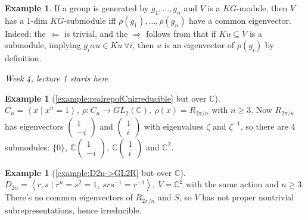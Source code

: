 \documentclass[a4paper]{article}
\newcommand{\la}{\left\langle}
\newcommand{\ra}{\right\rangle}
\newcommand{\C}{\mathbb{C}}
\theoremstyle{definition}
\newtheorem{example}[defn]{Example}
\begin{document}
\begin{example}
If a group is generated by $g_1,\ldots,g_n$ and $V$ is a $KG$-module, then $V$ has a 1-dim $KG$-submodule iff $\rho(g_1),\ldots,\rho(g_n)$ have a common eigenvector. Indeed; the $\Leftarrow$ is trivial, and the $\Rightarrow$ follows from that if $Ku\subseteq V$ is a submodule, implying $g_i\alpha u\in Ku \ \forall i$, then $u$ is an eigenvector of $\rho(g_i)$ by definition.
\end{example}

\begin{flushright}
\textit{Week 4, lecture 1 starts here}
\end{flushright}

\begin{example}[\ref{example:realrepofCnirreducible} but over $\C$]
$C_n=\la x\mid x^n=1\ra,\ \rho:C_n\rightarrow GL_2(\C),\ \rho(x)=R_{2\pi/n}$ with $n\geq 3$. Now $R_{2\pi /n}$ has eigenvectors $\begin{pmatrix}1\\-i\end{pmatrix}$ and $\begin{pmatrix}1\\i\end{pmatrix}$ with eigenvalues $\zeta$ and $\zeta^{-1}$, so there are 4 submodules: $\{0\},\ \C\begin{pmatrix}1\\-i\end{pmatrix},\ \C\begin{pmatrix}1\\i\end{pmatrix}$ and $\C^2$.
\end{example}

\begin{example}[\ref{example:D2n->GL2R} but over $\C$]
$D_{2n}=\la r,s\mid r^n=s^2=1,\ srs^{-1}=r^{-1}\ra,\ V=\C^2$ with the same action and $n\geq 3$. There's no common eigenvectors of $R_{2\pi/n}$ and $S$, so $V$ has not proper nontrivial subrepresentations, hence irreducible.
\end{example}
\end{document}
